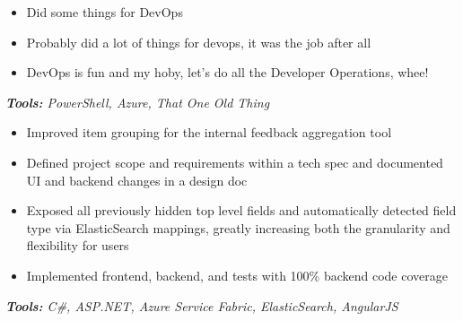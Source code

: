 \documentclass[10pt,letter]{altacv}
\begin{document}

\begin{fullwidth}
\marginpar{\makesidebarheader}
    \vspace*{-1\baselineskip}
\makecvheader
\end{fullwidth}


\begin{itemize}
  \item Did some things for DevOps
  \item Probably did a lot of things for devops, it was the job after all
  \item DevOps is fun and my hoby, let's do all the Developer Operations, whee!
\end{itemize}
\textit{\textbf{Tools:} PowerShell, Azure, That One Old Thing}

\divider

\begin{itemize}
\item Improved item grouping for the internal feedback aggregation tool
\item Defined project scope and requirements within a tech spec and documented UI and backend changes in a design doc
\item Exposed all previously hidden top level fields and automatically detected field type via ElasticSearch mappings, greatly increasing both the granularity and flexibility for users
\item Implemented frontend, backend, and tests with 100\% backend code coverage
\end{itemize}
\textit{\textbf{Tools:} C\#, ASP.NET, Azure Service Fabric, ElasticSearch, AngularJS}
\end{document}
